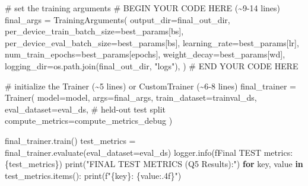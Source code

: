 \documentclass[
  letterpaper,
  DIV=11,
  numbers=noendperiod]{scrartcl}
\newenvironment{Shaded}{\begin{snugshade}}{\end{snugshade}}
\newcommand{\BuiltInTok}[1]{\textcolor[rgb]{0.00,0.23,0.31}{#1}}
\newcommand{\CommentTok}[1]{\textcolor[rgb]{0.37,0.37,0.37}{#1}}
\newcommand{\ControlFlowTok}[1]{\textcolor[rgb]{0.00,0.23,0.31}{\textbf{#1}}}
\newcommand{\KeywordTok}[1]{\textcolor[rgb]{0.00,0.23,0.31}{\textbf{#1}}}
\newcommand{\NormalTok}[1]{\textcolor[rgb]{0.00,0.23,0.31}{#1}}
\newcommand{\OperatorTok}[1]{\textcolor[rgb]{0.37,0.37,0.37}{#1}}
\newcommand{\RegionMarkerTok}[1]{\textcolor[rgb]{0.00,0.23,0.31}{#1}}
\newcommand{\SpecialCharTok}[1]{\textcolor[rgb]{0.37,0.37,0.37}{#1}}
\newcommand{\SpecialStringTok}[1]{\textcolor[rgb]{0.13,0.47,0.30}{#1}}
\newcommand{\StringTok}[1]{\textcolor[rgb]{0.13,0.47,0.30}{#1}}
\begin{document}
\begin{Shaded}
\begin{Highlighting}[]
    \CommentTok{\# set the training arguments}
    \CommentTok{\# }\RegionMarkerTok{BEGIN}\CommentTok{ YOUR CODE HERE (\textasciitilde{}9{-}14 lines)}
\NormalTok{    final\_args }\OperatorTok{=}\NormalTok{ TrainingArguments(}
\NormalTok{        output\_dir}\OperatorTok{=}\NormalTok{final\_out\_dir,}
\NormalTok{        per\_device\_train\_batch\_size}\OperatorTok{=}\NormalTok{best\_params[}\StringTok{\textquotesingle{}bs\textquotesingle{}}\NormalTok{],}
\NormalTok{        per\_device\_eval\_batch\_size}\OperatorTok{=}\NormalTok{best\_params[}\StringTok{\textquotesingle{}bs\textquotesingle{}}\NormalTok{],}
\NormalTok{        learning\_rate}\OperatorTok{=}\NormalTok{best\_params[}\StringTok{\textquotesingle{}lr\textquotesingle{}}\NormalTok{],}
\NormalTok{        num\_train\_epochs}\OperatorTok{=}\NormalTok{best\_params[}\StringTok{\textquotesingle{}epochs\textquotesingle{}}\NormalTok{],}
\NormalTok{        weight\_decay}\OperatorTok{=}\NormalTok{best\_params[}\StringTok{\textquotesingle{}wd\textquotesingle{}}\NormalTok{],}
\NormalTok{        logging\_dir}\OperatorTok{=}\NormalTok{os.path.join(final\_out\_dir, }\StringTok{"logs"}\NormalTok{),}
\NormalTok{    )}
    \CommentTok{\# }\RegionMarkerTok{END}\CommentTok{ YOUR CODE HERE}

    \CommentTok{\# initialize the Trainer (\textasciitilde{}5 lines) or CustomTrainer (\textasciitilde{}6{-}8 lines)}
\NormalTok{    final\_trainer }\OperatorTok{=}\NormalTok{ Trainer(}
\NormalTok{        model}\OperatorTok{=}\NormalTok{model,}
\NormalTok{        args}\OperatorTok{=}\NormalTok{final\_args,}
\NormalTok{        train\_dataset}\OperatorTok{=}\NormalTok{trainval\_ds,}
\NormalTok{        eval\_dataset}\OperatorTok{=}\NormalTok{eval\_ds,          }\CommentTok{\# held{-}out test split}
\NormalTok{        compute\_metrics}\OperatorTok{=}\NormalTok{compute\_metrics\_debug}
\NormalTok{    )}

\NormalTok{    final\_trainer.train()}
\NormalTok{    test\_metrics }\OperatorTok{=}\NormalTok{ final\_trainer.evaluate(eval\_dataset}\OperatorTok{=}\NormalTok{eval\_ds)}
\NormalTok{    logger.info(}\SpecialStringTok{f\textquotesingle{}Final TEST metrics: }\SpecialCharTok{\{}\NormalTok{test\_metrics}\SpecialCharTok{\}}\SpecialStringTok{\textquotesingle{}}\NormalTok{)}
    \BuiltInTok{print}\NormalTok{(}\StringTok{"FINAL TEST METRICS (Q5 Results):"}\NormalTok{)}
    \ControlFlowTok{for}\NormalTok{ key, value }\KeywordTok{in}\NormalTok{ test\_metrics.items():}
      \BuiltInTok{print}\NormalTok{(}\SpecialStringTok{f"}\SpecialCharTok{\{}\NormalTok{key}\SpecialCharTok{\}}\SpecialStringTok{: }\SpecialCharTok{\{}\NormalTok{value}\SpecialCharTok{:.4f\}}\SpecialStringTok{"}\NormalTok{)}
    

\end{Highlighting}
\end{Shaded}
\end{document}
